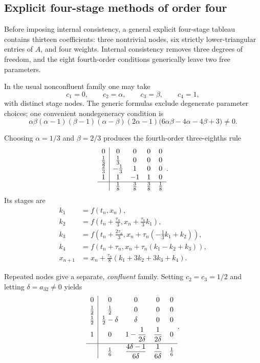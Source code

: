 \subsection{Explicit four-stage methods of order four}

Before imposing internal consistency, a general explicit four-stage
tableau contains thirteen coefficients: three nontrivial nodes, six
strictly lower-triangular entries of \(A\), and four weights. Internal
consistency removes three degrees of freedom, and the eight
fourth-order conditions generically leave two free parameters.

In the usual nonconfluent family one may take
\[
  c_1=0,
  \qquad
  c_2=\alpha,
  \qquad
  c_3=\beta,
  \qquad
  c_4=1,
\]
with distinct stage nodes. The generic formulas exclude degenerate
parameter choices; one convenient nondegeneracy condition is
\[
  \alpha\beta(\alpha-1)(\beta-1)(\alpha-\beta)(2\alpha-1)
  \bigl(6\alpha\beta-4\alpha-4\beta+3\bigr)\neq0.
\]

\begin{example}
  Choosing \(\alpha=1/3\) and \(\beta=2/3\) produces the
  fourth-order three-eighths rule
  \[
    \begin{array}{c|cccc}
      0&0&0&0&0\\
      \tfrac13&\tfrac13&0&0&0\\
      \tfrac23&-\tfrac13&1&0&0\\
      1&1&-1&1&0\\ \hline
       &\tfrac18&\tfrac38&\tfrac38&\tfrac18
    \end{array}.
  \]
  Its stages are
  \begin{align*}
    k_1&=f(t_n,x_n),\\
    k_2&=f\left(t_n+\frac{\tau_n}{3},
      x_n+\frac{\tau_n}{3}k_1\right),\\
    k_3&=f\left(t_n+\frac{2\tau_n}{3},
      x_n+\tau_n\left(-\frac13k_1+k_2\right)\right),\\
    k_4&=f\left(t_n+\tau_n,
      x_n+\tau_n(k_1-k_2+k_3)\right),\\
    x_{n+1}&=x_n+\frac{\tau_n}{8}
      (k_1+3k_2+3k_3+k_4).
  \end{align*}
\end{example}

Repeated nodes give a separate, \emph{confluent} family. Setting
\(c_2=c_3=1/2\) and letting \(\delta=a_{32}\neq0\) yields
\begin{equation}\label{eq:confluent-rk4-family-sep-04}
  \begin{array}{c|cccc}
    0&0&0&0&0\\[2pt]
    \tfrac12&\tfrac12&0&0&0\\[2pt]
    \tfrac12&\tfrac12-\delta&\delta&0&0\\[4pt]
    1&0&1-\dfrac{1}{2\delta}&\dfrac{1}{2\delta}&0\\[6pt] \hline
     &\tfrac16&\dfrac{4\delta-1}{6\delta}
       &\dfrac{1}{6\delta}&\tfrac16
  \end{array}.
\end{equation}


